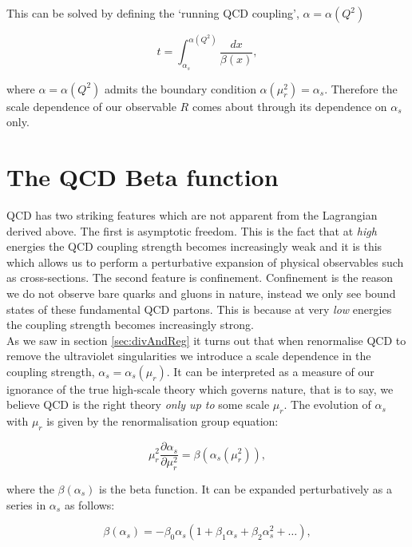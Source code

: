 		This can be solved by defining the `running QCD coupling', $\alpha=\alpha(Q^2)$

		\begin{equation}
			t = \int_{\alpha_s}^{\alpha(Q^2)}\frac{dx}{\beta(x)},
			\label{eqn:solvingRunning}
		\end{equation}

		where $\alpha=\alpha(Q^2)$ admits the boundary condition $\alpha(\mu_r^2)=\alpha_s$.  Therefore the scale dependence
		of our observable $R$ comes about through its dependence on $\alpha_s$ only.

\section{The QCD Beta function}
	\label{sec:betaFunction}

	QCD has two striking features which are not apparent from the Lagrangian derived above.  The first is asymptotic freedom.
	This is the fact that at \emph{high} energies the QCD coupling strength becomes increasingly weak and it is this which allows us to
	perform a perturbative expansion of physical observables such as cross-sections.  The second feature is confinement.  Confinement
	is the reason we do not observe bare quarks and gluons in nature, instead we only see bound states of these fundamental QCD partons.
	This is because at very \emph{low} energies the coupling strength becomes increasingly strong.\\As we saw in section \ref{sec:divAndReg}
	it turns out that when renormalise QCD to remove the ultraviolet singularities we introduce a scale dependence in the coupling strength,
	$\alpha_s = \alpha_s(\mu_r)$.  It can be interpreted as a measure of our ignorance of the true high-scale theory which governs nature,
	that is to say, we believe QCD is the right theory \emph{only up to} some scale $\mu_r$.  The evolution of $\alpha_s$ with $\mu_r$ is
	given by the renormalisation group equation:

	\begin{equation}
		\mu_r^2\frac{\partial\alpha_s}{\partial \mu_r^2} = \beta(\alpha_s(\mu_r^2)),
		\label{eqn:RSFlow}
	\end{equation}

	where the $\beta(\alpha_s)$ is the beta function.  It can be expanded perturbatively as a series in $\alpha_s$
	as follows:

	\begin{equation}
		\beta(\alpha_s) = -\beta_0\alpha_s\left(1 + \beta_1\alpha_s + \beta_2\alpha_s^2 + \ldots \right),
		\label{eqn:betaFunction}
	\end{equation}

